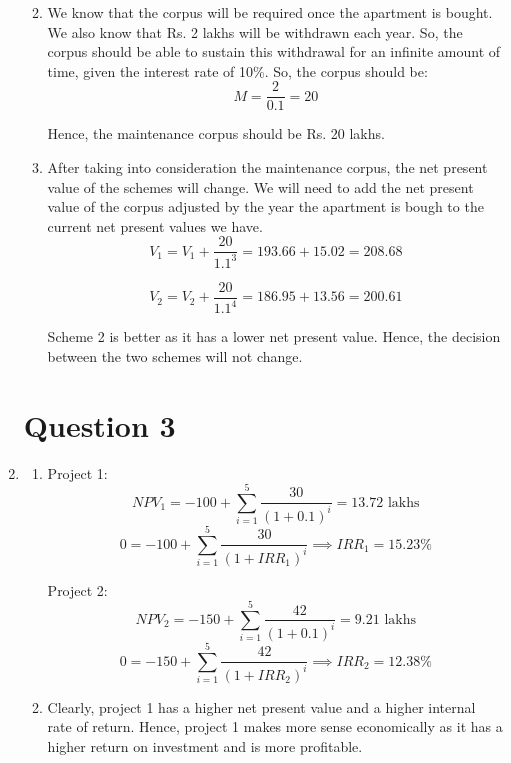 \documentclass[a4paper]{article}
\begin{document}
\begin{enumerate}
\begin{enumerate}
        \vspace*{15mm} 

        \item We know that the corpus will be required once the apartment is bought. We also know that Rs. 2 lakhs will be withdrawn each year. So, the corpus should be able to sustain this withdrawal for an infinite amount of time, given the interest rate of 10\%. So, the corpus should be:
        \[ M = \frac{2}{0.1} = 20 \]

        Hence, the maintenance corpus should be Rs. 20 lakhs.

        \vspace*{15mm}
        \item After taking into consideration the maintenance corpus, the net present value of the schemes will change. We will need to add the net present value of the corpus adjusted by the year the apartment is bough to the current net present values we have. \\
        
        \[ V_1 = V_1 + \frac{20}{1.1^3} = 193.66 + 15.02 = 208.68 \]

        \[ V_2 = V_2 + \frac{20}{1.1^4} = 186.95 + 13.56 = 200.61 \]

        Scheme 2 is better as it has a lower net present value. Hence, the decision between the two schemes will not change.
    \end{enumerate}
    
    \vspace*{15mm}
    \section*{Question 3}
    \item \begin{enumerate}
        \item Project 1: \\
        \[ NPV_1 = -100 + \sum_{i=1}^{5} \frac{30}{(1 + 0.1)^i} = 13.72 \text{ lakhs}\]
        \[ 0 = -100 + \sum_{i=1}^{5} \frac{30}{(1 + IRR_1)^i} \implies IRR_1 = 15.23\%\]

        Project 2: \\
        \[ NPV_2 = -150 + \sum_{i=1}^{5} \frac{42}{(1 + 0.1)^i} = 9.21 \text{ lakhs}\]
        \[ 0 = -150 + \sum_{i=1}^{5} \frac{42}{(1 + IRR_2)^i} \implies IRR_2 = 12.38\%\]

        \vspace*{15mm}
        \item Clearly, project 1 has a higher net present value and a higher internal rate of return. Hence, project 1 makes more sense economically as it has a higher return on investment and is more profitable.
    \end{enumerate}


\end{enumerate}
\end{document}
